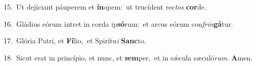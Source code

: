 {\numbfont\textcolor{\numbcolor}{15.}}~Ut dejíciant páuperem et \textbf{ín}\-opem:~\star ut trucídent rec\textit{tos} \textbf{cor}\-de.\par
{\numbfont\textcolor{\numbcolor}{16.}}~Gládius eórum intret in corda ip\-\textbf{só}\-rum:~\star et arcus eórum con\-\textit{frin}\-\textbf{gá}tur.\par
{\numbfont\textcolor{\numbcolor}{17.}}~Glória Patri, et \textbf{Fí}\-lio,~\star et Spirítu\textit{i} \textbf{Sanc}\-to.\par
{\numbfont\textcolor{\numbcolor}{18.}}~Sicut erat in princípio, et nunc, et \textbf{sem}\-per,~\star et in sǽcula sæculó\-\textit{rum}\-. \textbf{A}\-men.\par
